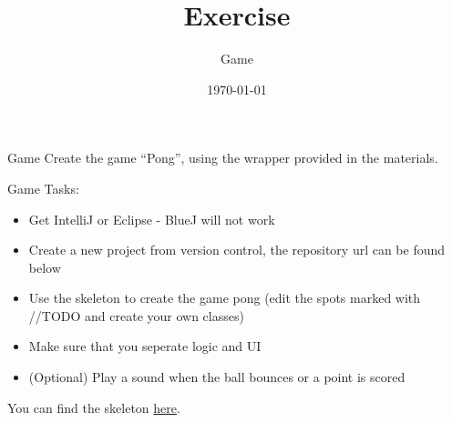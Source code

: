 


\title{Exercise}
\subtitle{Game}
\date{\today}




\begin{frame}
    \titlepage
\end{frame}

\begin{frame}[fragile]{Game}
    Create the game ``Pong'', using the wrapper provided in the materials.
\end{frame}

\begin{frame}{Game}
    Tasks:
    \begin{itemize}
        \item Get IntelliJ or Eclipse - BlueJ will not work
        \item Create a new project from version control, the repository url can be found below
        \item Use the skeleton to create the game pong (edit the spots marked with //TODO and create your own classes)
        \item Make sure that you seperate logic and UI
        \item (Optional) Play a sound when the ball bounces or a point is scored
    \end{itemize}
    You can find the skeleton \href{https://github.com/FriwiDev/java-lessons-game}{here}.
\end{frame}



